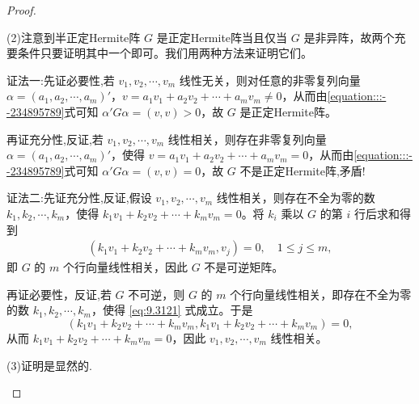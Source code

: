 \documentclass[../../main.tex]{subfiles}
\begin{document}
\begin{proof}
\begin{enumerate}
(2)注意到半正定Hermite阵 $G$ 是正定Hermite阵当且仅当 $G$ 是非异阵，故两个充要条件只要证明其中一个即可。我们用两种方法来证明它们。

{\color{blue}证法一:}先证必要性,若 $v_1,v_2,\cdots,v_m$ 线性无关，则对任意的非零复列向量 $\alpha=(a_1,a_2,\cdots,a_m)'$，$v = a_1v_1 + a_2v_2 + \cdots + a_mv_m\neq0$，从而由\eqref{equation:::--234895789}式可知 $\alpha'G\alpha=(v,v)>0$，故 $G$ 是正定Hermite阵。

再证充分性,反证,若 $v_1,v_2,\cdots,v_m$ 线性相关，则存在非零复列向量 $\alpha=(a_1,a_2,\cdots,a_m)'$，使得 $v = a_1v_1 + a_2v_2 + \cdots + a_mv_m = 0$，从而由\eqref{equation:::--234895789}式可知 $\alpha'G\alpha=(v,v)=0$，故 $G$ 不是正定Hermite阵,矛盾!

{\color{blue}证法二:}先证充分性,反证,假设 $v_1,v_2,\cdots,v_m$ 线性相关，则存在不全为零的数 $k_1,k_2,\cdots,k_m$，使得 $k_1v_1 + k_2v_2 + \cdots + k_mv_m = 0$。将 $k_i$ 乘以 $G$ 的第 $i$ 行后求和得到
\begin{align}
(k_1v_1 + k_2v_2 + \cdots + k_mv_m,v_j)=0,\quad 1\leqslant  j\leqslant  m,\label{eq:9.3121}
\end{align}
即 $G$ 的 $m$ 个行向量线性相关，因此 $G$ 不是可逆矩阵。

再证必要性，反证,若 $G$ 不可逆，则 $G$ 的 $m$ 个行向量线性相关，即存在不全为零的数 $k_1,k_2,\cdots,k_m$，使得 \eqref{eq:9.3121} 式成立。于是
\[
(k_1v_1 + k_2v_2 + \cdots + k_mv_m,k_1v_1 + k_2v_2 + \cdots + k_mv_m)=0,
\]
从而 $k_1v_1 + k_2v_2 + \cdots + k_mv_m = 0$，因此 $v_1,v_2,\cdots,v_m$ 线性相关。

(3)证明是显然的.
\end{enumerate}

\end{proof}
\end{document}
